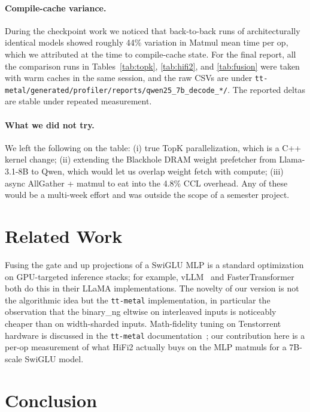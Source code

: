 \documentclass[sigplan,nonacm]{acmart}
\newcommand{\code}[1]{\texttt{\nolinkurl{#1}}}
\begin{document}
\paragraph{Compile-cache variance.} During the checkpoint work we
noticed that back-to-back runs of architecturally identical models
showed roughly 44\% variation in Matmul mean time per op, which we
attributed at the time to compile-cache state. For the final report,
all the comparison runs in Tables~\ref{tab:topk}, \ref{tab:hifi2},
and \ref{tab:fusion} were taken with warm caches in the same
session, and the raw CSVs are under
\code{tt-metal/generated/profiler/reports/qwen25_7b_decode_*/}.
The reported deltas are stable under repeated measurement.

\paragraph{What we did not try.} We left the following on the table:
(i) true TopK parallelization, which is a C++ kernel change; (ii)
extending the Blackhole DRAM weight prefetcher from Llama-3.1-8B to
Qwen, which would let us overlap weight fetch with compute; (iii)
async AllGather + matmul to eat into the 4.8\% CCL overhead. Any of
these would be a multi-week effort and was outside the scope of a
semester project.

\section{Related Work}

Fusing the gate and up projections of a SwiGLU MLP is a standard
optimization on GPU-targeted inference stacks; for example,
vLLM~\cite{vllm} and FasterTransformer both do this in their LLaMA
implementations. The novelty of our version is not the algorithmic
idea but the \texttt{tt-metal} implementation, in particular the
observation that the binary\_ng eltwise on interleaved inputs is
noticeably cheaper than on width-sharded inputs. Math-fidelity
tuning on Tenstorrent hardware is discussed in the
\texttt{tt-metal} documentation~\cite{ttmetal}; our contribution
here is a per-op measurement of what HiFi2 actually buys on the
MLP matmuls for a 7B-scale SwiGLU model.

\section{Conclusion}
\end{document}
